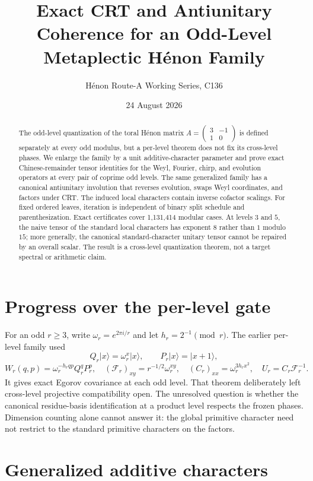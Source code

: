 \documentclass[11pt]{article}
\title{Exact CRT and Antiunitary Coherence for an Odd-Level Metaplectic H\'enon Family}
\author{H\'enon Route-A Working Series, C136}
\date{24 August 2026}
\newcommand{\F}{\mathcal F}
\begin{document}
\maketitle
\begin{abstract}
The odd-level quantization of the toral H\'enon matrix
$A=\left(\begin{smallmatrix}3&-1\\1&0\end{smallmatrix}\right)$ is defined
separately at every odd modulus, but a per-level theorem does not fix its
cross-level phases.  We enlarge the family by a unit additive-character
parameter and prove exact Chinese-remainder tensor identities for the Weyl,
Fourier, chirp, and evolution operators at every pair of coprime odd levels.
The same generalized family has a canonical antiunitary involution that
reverses evolution, swaps Weyl coordinates, and factors under CRT.  The
induced local characters contain inverse cofactor scalings.  For fixed ordered
leaves, iteration is independent of binary split schedule and parenthesization.
Exact certificates cover 1,131,414 modular cases.  At levels $3$ and $5$, the
naive tensor of the standard local characters has exponent $8$ rather than
$1$ modulo $15$; more generally, the canonical standard-character unitary
tensor cannot be repaired by an overall scalar.  The result is a
cross-level quantization theorem, not a target spectral or arithmetic claim.
\end{abstract}

\section{Progress over the per-level gate}

For an odd $r\ge3$, write $\omega_r=e^{2\pi i/r}$ and let
$h_r=2^{-1}\pmod r$.  The earlier per-level family used
\[
 Q_r|x\rangle=\omega_r^x|x\rangle,\qquad
 P_r|x\rangle=|x+1\rangle,
\]
\[
 W_r(q,p)=\omega_r^{-h_rqp}Q_r^qP_r^p,\quad
 (\F_r)_{xy}=r^{-1/2}\omega_r^{xy},\quad
 (C_r)_{xx}=\omega_r^{3h_rx^2},\quad U_r=C_r\F_r^{-1}.
\]
It gives exact Egorov covariance at each odd level.  That theorem deliberately
left cross-level projective compatibility open.  The unresolved question is
whether the canonical residue-basis identification at a product level respects
the frozen phases.  Dimension counting alone cannot answer it: the global
primitive character need not restrict to the standard primitive characters on
the factors.

\section{Generalized additive characters}
\end{document}
